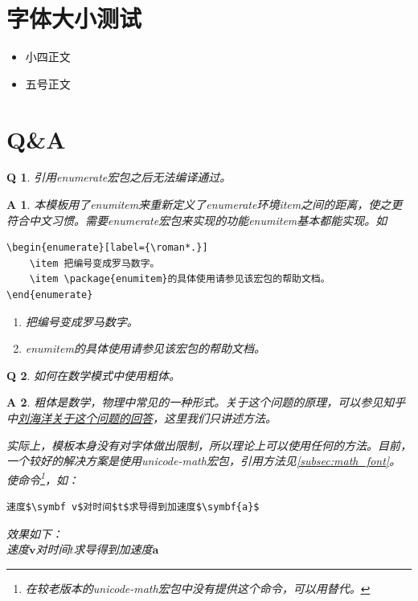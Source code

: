 \documentclass{LZU}
\newcommand{\package}[1]{{\sffamily #1}}
\newtheorem*{answer}{A}
\newtheorem{question}{Q}
\begin{document}
\section{字体大小测试}
\begin{itemize}
    \item {小四}正文
    \item {五号}正文
\end{itemize}

\backmatter
\printbibliography[title={参考文献},heading=bibintoc]
\Appendix
\section{Q\&A}
\begin{question}
    引用\package{enumerate}宏包之后无法编译通过。
\end{question}
\begin{answer}
    本模板用了\package{enumitem}来重新定义了enumerate环境item之间的距离，使之更符合中文习惯。需要\package{enumerate}宏包来实现的功能\package{enumitem}基本都能实现。如
\begin{verbatim}
\begin{enumerate}[label={\roman*.}]
    \item 把编号变成罗马数字。
    \item \package{enumitem}的具体使用请参见该宏包的帮助文档。
\end{enumerate}
\end{verbatim}
    \begin{enumerate}[label={\roman*.}]
        \item 把编号变成罗马数字。
        \item \package{enumitem}的具体使用请参见该宏包的帮助文档。
    \end{enumerate}
\end{answer}
\begin{question}
    如何在数学模式中使用粗体。
\end{question}
\begin{answer}
    粗体是数学，物理中常见的一种形式。关于这个问题的原理，可以参见知乎中\href{https://www.zhihu.com/question/25290041/answer/30422583}{刘海洋关于这个问题的回答}\cite{mathboldfont}，这里我们只讲述方法。

    实际上，模板本身没有对字体做出限制，所以理论上可以使用任何的方法。目前，一个较好的解决方案是使用\package{unicode-math}宏包，引用方法见\cref{subsec:math_font}。使\texttt{\symbf}命令\footnote{在较老版本的\package{unicode-math}宏包中没有提供这个命令，可以用\texttt{\mathbf}替代。}，如：
\begin{verbatim}
速度$\symbf v$对时间$t$求导得到加速度$\symbf{a}$
\end{verbatim}
效果如下：\\
速度$\symbf v$对时间$t$求导得到加速度$\symbf{a}$
\end{answer}
\end{document}
